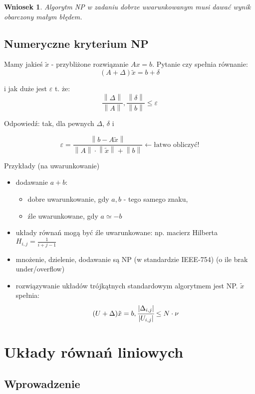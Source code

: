 \documentclass[hidelinks,a4paper,fleqn,oneside]{book}
\newcommand{\la}{\leftarrow}
\newcommand{\norm}[1]{\left\lVert#1\right\rVert}
\newtheorem{wniosek}{Wniosek}
\begin{document}
\begin{wniosek} Algorytm NP w zadaniu dobrze uwarunkowanym musi dawać wynik obarczony małym błędem. \end{wniosek}

\section{Numeryczne kryterium NP}

Mamy jakieś $\tilde{x}$ - przybliżone rozwiązanie $Ax = b$. Pytanie czy spełnia równanie:
\[
	(A + \Delta)\tilde{x} = b + \delta
\]

i jak duże jest $\varepsilon$ t. że:
\[
	\frac{\norm{\Delta}}{\norm{A}}, \frac{\norm{\delta}}{\norm{b}} \leq \varepsilon
\]

Odpowiedź: tak, dla pewnych $\Delta$, $\delta$ i 

\[
	\varepsilon = \frac{\norm{b - A\tilde{x}}}{\norm{A} \cdot \norm{\tilde{x}} + \norm{b}} \la \textrm{łatwo obliczyć!}
\]

Przykłady (na uwarunkowanie)

\begin{itemize}
	\item dodawanie $a+b$:
	      \begin{itemize}
	      	\item dobre uwarunkowanie, gdy $a, b$ -  tego samego znaku,
	      	\item źle uwarunkowane, gdy $a \simeq -b$
	      \end{itemize}
	\item układy równań mogą być źle uwarunkowane: np. macierz Hilberta $H_{i,j} = \frac{1}{i+j-1}$
	\item mnożenie, dzielenie, dodawanie są NP (w standardzie IEEE-754) (o ile brak under/overflow)
	\item rozwiązywanie układów trójkątnych standardowym algorytmem jest NP. $\tilde{x}$ spełnia:
	      \[
	      	(U+\Delta)\tilde{x} = b, \cfrac{|\Delta_{i, j}|}{|U_{i, j}|} \leq N \cdot \nu
	      \]
\end{itemize}

\chapter{Układy równań liniowych}

\section{Wprowadzenie}
\end{document}
